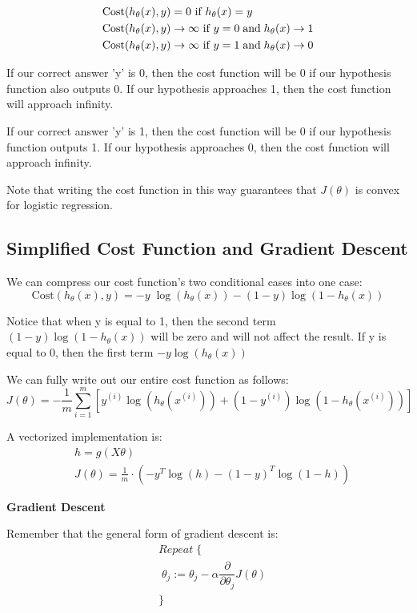 \documentclass{article}
\begin{document}
\begin{align*}
	& \mathrm{Cost}(h_\theta(x),y) = 0 \text{ if } h_\theta(x) = y \\ 
	& \mathrm{Cost}(h_\theta(x),y) \rightarrow \infty \text{ if } y = 0 \; \mathrm{and} \; h_\theta(x) \rightarrow 1 \\ 
	& \mathrm{Cost}(h_\theta(x),y) \rightarrow \infty \text{ if } y = 1 \; \mathrm{and} \; h_\theta(x) \rightarrow 0 \newline 
\end{align*}

If our correct answer 'y' is 0, then the cost function will be 0 if our hypothesis function also outputs 0. If our hypothesis approaches 1, then the cost function will approach infinity.

If our correct answer 'y' is 1, then the cost function will be 0 if our hypothesis function outputs 1. If our hypothesis approaches 0, then the cost function will approach infinity.

Note that writing the cost function in this way guarantees that $J(\theta)$ is convex for logistic regression.

\subsection{Simplified Cost Function and Gradient Descent}
We can compress our cost function's two conditional cases into one case:
$$\mathrm{Cost}(h_\theta(x),y) = - y \; \log(h_\theta(x)) - (1 - y) \log(1 - h_\theta(x))$$

Notice that when y is equal to 1, then the second term $(1-y)\log(1-h_\theta(x))$ will be zero and will not affect the result. If y is equal to 0, then the first term $-y \log(h_\theta(x))$

We can fully write out our entire cost function as follows:
$$J(\theta) = - \frac{1}{m} \displaystyle \sum_{i=1}^m [y^{(i)}\log (h_\theta (x^{(i)})) + (1 - y^{(i)})\log (1 - h_\theta(x^{(i)}))]$$

A vectorized implementation is:
\begin{align*} 
	& h = g(X\theta)\\ 
	& J(\theta) = \frac{1}{m} \cdot \left(-y^{T}\log(h)-(1-y)^{T}\log(1-h)\right)
\end{align*}

\textbf{Gradient Descent}

Remember that the general form of gradient descent is:
\begin{align*}
	& Repeat \; \lbrace \\ 
	& \; \theta_j := \theta_j - \alpha \dfrac{\partial}{\partial \theta_j}J(\theta) \\ 
	& \rbrace
\end{align*}
\end{document}
